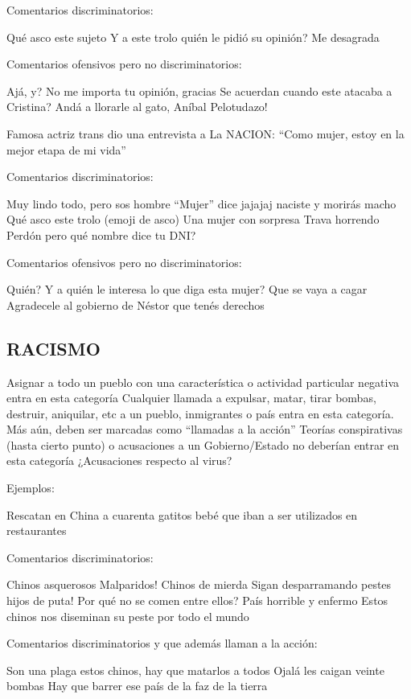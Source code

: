 Comentarios discriminatorios:

Qué asco este sujeto
Y a este trolo quién le pidió su opinión?
Me desagrada


Comentarios ofensivos pero no discriminatorios:

Ajá, y?
No me importa tu opinión, gracias
Se acuerdan cuando este atacaba a Cristina? Andá a llorarle al gato, Aníbal
Pelotudazo!


Famosa actriz trans dio una entrevista a La NACION: “Como mujer, estoy en la mejor etapa de mi vida”


Comentarios discriminatorios:

Muy lindo todo, pero sos hombre
“Mujer” dice jajajaj naciste y morirás macho
Qué asco este trolo
(emoji de asco)
Una mujer con sorpresa
Trava horrendo
Perdón pero qué nombre dice tu DNI?


Comentarios ofensivos pero no discriminatorios:

Quién?
Y a quién le interesa lo que diga esta mujer?
Que se vaya a cagar
Agradecele al gobierno de Néstor que tenés derechos





\subsection{RACISMO}

Asignar a todo un pueblo con una característica o actividad particular negativa entra en esta categoría
Cualquier llamada a expulsar, matar, tirar bombas, destruir, aniquilar, etc a un pueblo, inmigrantes o país entra en esta categoría. Más aún, deben ser marcadas como “llamadas a la acción”
Teorías conspirativas (hasta cierto punto) o acusaciones a un Gobierno/Estado no deberían entrar en esta categoría
¿Acusaciones respecto al virus?



Ejemplos:

Rescatan en China a cuarenta gatitos bebé que iban a ser utilizados en restaurantes


Comentarios discriminatorios:

Chinos asquerosos
Malparidos! Chinos de mierda
Sigan desparramando pestes hijos de puta!
Por qué no se comen entre ellos? 
País horrible y enfermo
Estos chinos nos diseminan su peste por todo el mundo

Comentarios discriminatorios y que además llaman a la acción:

Son una plaga estos chinos, hay que matarlos a todos
Ojalá les caigan veinte bombas
Hay que barrer ese país de la faz de la tierra

